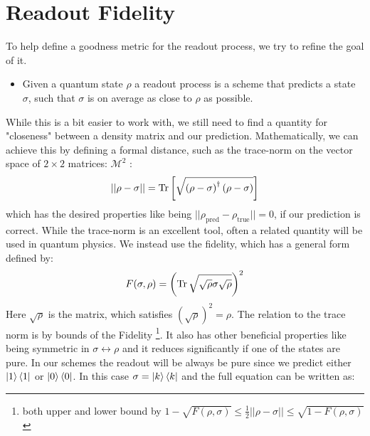 





\section{Readout Fidelity}
To help define a goodness metric for the readout process, we try to refine the goal of it.
\begin{itemize}
    \item Given a quantum state $\rho$ a readout process is a scheme that predicts a state $\sigma$, such that $\sigma$ is on average as close to $\rho$ as possible.
\end{itemize}
While this is a bit easier to work with, we still need to find a quantity for "closeness" between a density matrix and our prediction. Mathematically, we can achieve this by defining a formal distance, such as the trace-norm on the vector space of $2\times2$ matrices: $\mathcal{M}^2$ \cite{wilde_classical_2016}:
\begin{equation}
    ||\rho - \sigma|| = \Tr \left[\sqrt{\left(\rho - \sigma \right)^\dagger \left(\rho - \sigma \right)} \right]
\end{equation}
which has the desired properties like being $||\rho_{\text{pred}} - \rho_{\text{true}}|| = 0$, if our prediction is correct. While the trace-norm is an excellent tool, often a related quantity will be used in quantum physics.  We instead use the fidelity, which has a general form defined by:
\begin{equation}
    F(\sigma, \rho) = \left(\Tr\sqrt{\sqrt{\rho} \sigma \sqrt{\rho}}\right)^2
\end{equation}
Here $\sqrt{\rho}$ is the matrix, which satisfies $(\sqrt{\rho})^2 = \rho$. The relation to the trace norm is by bounds of the Fidelity \footnote{both upper and lower bound by $1 - \sqrt{F(\rho, \sigma)} \leq \frac{1}{2} ||\rho - \sigma|| \leq \sqrt{1 - F(\rho, \sigma)}$ \cite{wilde_classical_2016}}.  It also has other beneficial properties like being  symmetric in $\sigma \leftrightarrow \rho$ and it reduces significantly if one of the states are pure. In our schemes the readout will be always be pure since we predict either $\ket{1}\bra{1}$ or $\ket{0}\bra{0}$. In this case $\sigma = \ket{k}\bra{k}$ and the full equation can be written as:
